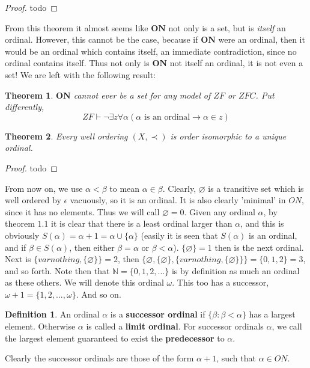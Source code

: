 \documentclass{article}
\theoremstyle{definition}
\newtheorem{definition}{Definition}[section]
\theoremstyle{plain}
\theoremstyle{theorem}
\newtheorem{theorem}{Theorem}[section]
\begin{document}
\begin{proof}
 todo
\end{proof}
From this theorem it almost seems like $\bm{ON}$  not only is a set, but is \textit{itself} an ordinal. However, this cannot be the case, because if $\bm{ON}$ were an ordinal, then it would be an ordinal which contains itself, an immediate contradiction, since no ordinal contains itself. Thus not only is $\bm{ON}$ not itself an ordinal, it is not even a set! We are left with the following result:
\begin{theorem}
	$\bm{ON}$ cannot ever be a set for any model of $ZF$ or $ZFC$. Put differently,  \[ZF \vdash \neg \exists z \forall \alpha (\alpha \textrm{ is an ordinal} \rightarrow \alpha \in z) \] 
\end{theorem}
\begin{theorem}
	Every well ordering $(X,\prec)$ is order isomorphic to a unique ordinal. 
\end{theorem}
\begin{proof}
 todo
\end{proof}
From now on, we use $\alpha < \beta$ to mean $\alpha \in \beta$. Clearly, $\varnothing$ is a transitive set which is well ordered by $\epsilon$ vacuously, so it is an ordinal. It is also clearly 'minimal' in $ON$, since it has no elements. Thus we will call $\varnothing = 0$. Given any ordinal $\alpha$, by theorem $1.1$ it is clear that there is a least ordinal larger than $\alpha$, and this is obviously $S(\alpha) = \alpha+1 = \alpha \cup \{\alpha\}$ (easily it is seen that $S(\alpha)$ is an ordinal, and if $\beta \in S(\alpha)$, then either $\beta = \alpha$ or $\beta < \alpha$).  $\{\varnothing\} = 1$ then is the next ordinal. Next is $\{varnothing,\{\varnothing\}\} = 2$, then $\{\varnothing,\{\varnothing\},\{varnothing,\{\varnothing\}\}\} = \{0,1,2\} = 3$, and so forth. Note then that $\mathbb{N} = \{0,1,2,...\}$ is by definition as much an ordinal as these others. We will denote this ordinal $\omega$. This too has a successor, $\omega+1 = \{1,2,...,\omega\}$. And so on. 
\begin{definition}
	An ordinal $\alpha$ is a \textbf{successor ordinal} if $\{\beta: \beta < \alpha\}$ has a largest element. Otherwise $\alpha$ is called a \textbf{limit ordinal}. For successor ordinals $\alpha$, we call the largest element guaranteed to exist the \textbf{predecessor} to $\alpha$.  
\end{definition}  
Clearly the successor ordinals are those of the form $\alpha+1$, such that $\alpha \in ON$. \par 
\end{document}
